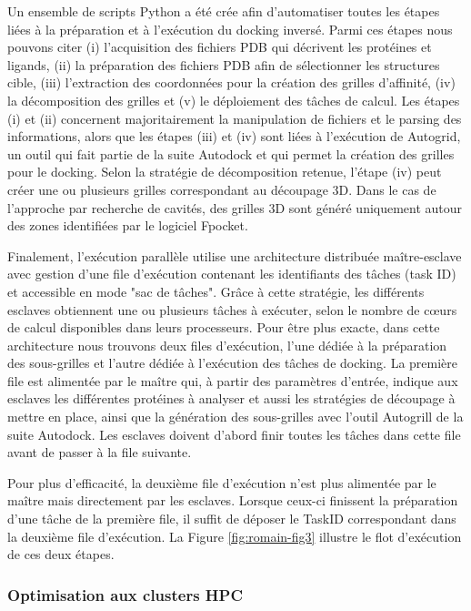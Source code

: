 Un ensemble de scripts Python a été crée afin d'automatiser toutes les étapes liées à la préparation et à l'exécution du docking inversé. Parmi ces étapes nous pouvons citer (i) l'acquisition des fichiers PDB qui décrivent les protéines et ligands, (ii) la préparation des fichiers PDB afin de sélectionner les structures cible, (iii) l'extraction des coordonnées pour la création des grilles d'affinité, (iv) la décomposition des grilles et (v) le déploiement des tâches de calcul. Les étapes (i) et (ii) concernent majoritairement la manipulation de fichiers et le parsing des informations, alors que les étapes  (iii) et (iv) sont liées à l'exécution de Autogrid, un outil qui fait partie de la suite Autodock et qui permet la création des grilles pour le docking. Selon la stratégie de décomposition retenue, l'étape (iv) peut créer une ou plusieurs grilles correspondant au découpage 3D. Dans le cas de l'approche par recherche de cavités, des grilles 3D sont généré uniquement autour des zones identifiées par le logiciel Fpocket. 

Finalement, l'exécution parallèle utilise une architecture distribuée maître-esclave avec gestion d'une file d'exécution contenant les identifiants des tâches (task ID) et accessible en mode "sac de tâches". Grâce à cette stratégie, les différents esclaves obtiennent une ou plusieurs tâches à exécuter, selon le nombre de c{\oe}urs de calcul disponibles dans leurs processeurs.
Pour être plus exacte, dans cette architecture nous trouvons deux files d'exécution, l'une dédiée à la préparation des sous-grilles et l'autre dédiée à l'exécution des tâches de docking. La première file est alimentée par le maître qui, à partir des paramètres d'entrée, indique aux esclaves les différentes protéines à analyser et aussi les stratégies de découpage à mettre en place, ainsi que la génération des sous-grilles avec l'outil Autogrill de la suite Autodock. Les esclaves doivent d'abord finir toutes les tâches dans cette file avant de passer à la file suivante.

Pour plus d'efficacité, la deuxième file d'exécution n'est plus alimentée par le maître mais directement par les esclaves. Lorsque ceux-ci finissent la préparation d'une tâche de la première file, il suffit de déposer le TaskID correspondant dans la deuxième file d'exécution. La Figure \ref{fig:romain-fig3} illustre le flot d'exécution de ces deux étapes.  


\subsubsection{Optimisation aux clusters HPC}

